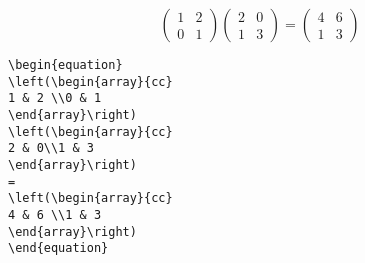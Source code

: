 \documentclass[a4paper]{article}
\newlength{\egwidth}\setlength{\egwidth}{0.45\textwidth}
\newenvironment{eg}%
{\begin{list}{}{\setlength{\leftmargin}{0pt}%
\setlength{\rightmargin}{\leftmargin}}\item[]\footnotesize}%
{\end{list}}
\newenvironment{egbox}%
{\begin{minipage}[t]{\egwidth}}%
{\end{minipage}}
\newcommand{\egstart}{\begin{eg}\begin{egbox}}
\newcommand{\egmid}{\end{egbox}\hfill\begin{egbox}}
\newcommand{\egend}{\end{egbox}\end{eg}}
\begin{document}
\egstart
\begin{equation}
\left(\begin{array}{cc}
1 & 2 \\0 & 1
\end{array}\right)
\left(\begin{array}{cc}
2 & 0\\1 & 3
\end{array}\right)
=
\left(\begin{array}{cc}
4 & 6 \\1 & 3
\end{array}\right)
\end{equation}
\egmid
\begin{verbatim}
\begin{equation}
\left(\begin{array}{cc}
1 & 2 \\0 & 1
\end{array}\right)
\left(\begin{array}{cc}
2 & 0\\1 & 3
\end{array}\right)
=
\left(\begin{array}{cc}
4 & 6 \\1 & 3
\end{array}\right)
\end{equation}
\end{verbatim}
\egend
\end{document}
